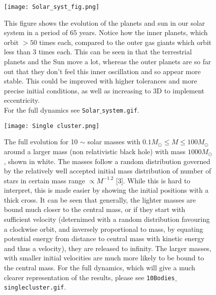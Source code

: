 \documentclass[11pt]{article}
\begin{document}
\begin{figure}[H]
  \centering
	\texttt{[image: Solar\_syst\_fig.png]}
\caption{This figure shows the evolution of the planets and sun in our solar system in a period of $65$ years. Notice how the inner planets, which orbit $>50$ times each, compared to the outer gas giants which orbit less than $3$ times each. This can be seen in that the terrestrial planets and the Sun move a lot, whereas the outer planets are so far out that they don't feel this inner oscillation and so appear more stable. This could be improved with higher tolerances and more precise initial conditions, as well as increasing to 3D to implement eccentricity.\\
For the full dynamics see \texttt{Solar$\_$system.gif}.}
    \label{Solar_syst}
\end{figure}
\newpage





\begin{figure}[H]
\centering
	\texttt{[image: Single cluster.png]}
\caption{The full evolution for 10 $\sim$ solar masses with $0.1M_{\odot} \le M \le 100M_{\odot}$ around a larger mass (non relativistic black hole) with mass $1000M_{\odot}$, shown in white. The masses follow a random distribution governed by the relatively well accepted initial mass distribution of number of stars in certain mass range $\propto M^{-1.2}$ [3]. While this is hard to interpret, this is made easier by showing the initial positions with a thick cross. It can be seen that generally, the lighter masses are bound much closer to the central mass, or if they start with sufficient velocity (deternimed with a random distribution favouring a clockwise orbit, and inversely proportional to mass, by equating potential energy from distance to central mass with kinetic energy and thus a velocity), they are released to infinity. The larger masses, with smaller initial velocities are much more likely to be bound to the central mass. For the full dynamics, which will give a much clearer representation of the results, please see \texttt{10Bodies$\_$singlecluster.gif}.}
\label{SingleClust}
\end{figure}
\newpage
\end{document}
